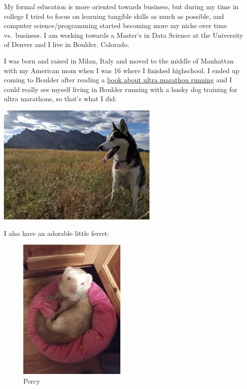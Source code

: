 \documentclass[
]{book}
\begin{document}
My formal education is more oriented towards business, but during my time in college I tried to focus on learning tangible skills as much as possible, and computer science/programming started becoming more my niche over time vs.~business. I am working towards a Master's in Data Science at the University of Denver and I live in Boulder, Colorado.

I was born and raised in Milan, Italy and moved to the middle of Manhattan with my American mom when I was 16 where I finished highschool. I ended up coming to Boulder after reading a \href{http://www.scottjurek.com/eat-run}{book about ultra marathon running} and I could really see myself living in Boulder running with a husky dog training for ultra marathons, so that's what I did:

\includegraphics{images/sakura.jpg}

I also have an adorable little ferret:

\begin{figure}
\centering
\includegraphics{images/percy_pic.jpg}
\caption{Percy}
\end{figure}
\end{document}
